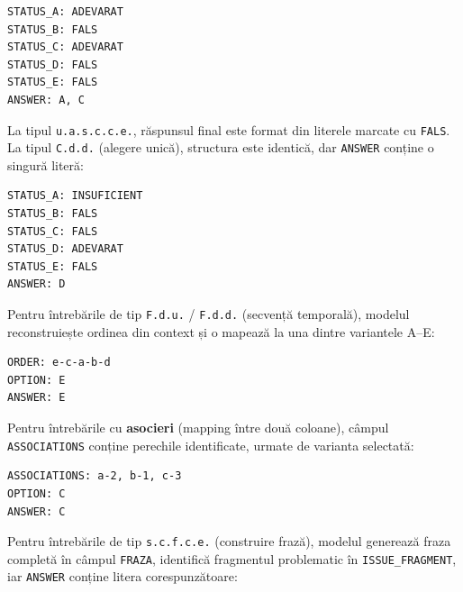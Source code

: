 \documentclass[12pt, a4paper, oneside, romanian]{teza-upb}
\begin{document}
\begin{center}
\begin{minipage}{0.34\textwidth}
\begin{lstlisting}[numbers=none]
STATUS_A: ADEVARAT
STATUS_B: FALS
STATUS_C: ADEVARAT
STATUS_D: FALS
STATUS_E: FALS
ANSWER: A, C
\end{lstlisting}
\end{minipage}
\end{center}

La tipul \texttt{u.a.s.c.c.e.}, răspunsul final este format din literele marcate cu \texttt{FALS}. La tipul \texttt{C.d.d.} (alegere unică), structura este identică, dar \texttt{ANSWER} conține o singură literă:

\begin{center}
\begin{minipage}{0.34\textwidth}
\begin{lstlisting}[numbers=none]
STATUS_A: INSUFICIENT
STATUS_B: FALS
STATUS_C: FALS
STATUS_D: ADEVARAT
STATUS_E: FALS
ANSWER: D
\end{lstlisting}
\end{minipage}
\end{center}

Pentru întrebările de tip \texttt{F.d.u.} / \texttt{F.d.d.} (secvență temporală), modelul reconstruiește ordinea din context și o mapează la una dintre variantele A--E:

\begin{center}
\begin{minipage}{0.30\textwidth}
\begin{lstlisting}[numbers=none]
ORDER: e-c-a-b-d
OPTION: E
ANSWER: E
\end{lstlisting}
\end{minipage}
\end{center}

Pentru întrebările cu \textbf{asocieri} (mapping între două coloane), câmpul \texttt{ASSOCIATIONS} conține perechile identificate, urmate de varianta selectată:

\begin{center}
\begin{minipage}{0.42\textwidth}
\begin{lstlisting}[numbers=none]
ASSOCIATIONS: a-2, b-1, c-3
OPTION: C
ANSWER: C
\end{lstlisting}
\end{minipage}
\end{center}

Pentru întrebările de tip \texttt{s.c.f.c.e.} (construire frază), modelul generează fraza completă în câmpul \texttt{FRAZA}, identifică fragmentul problematic în \texttt{ISSUE\_FRAGMENT}, iar \texttt{ANSWER} conține litera corespunzătoare:
\end{document}
